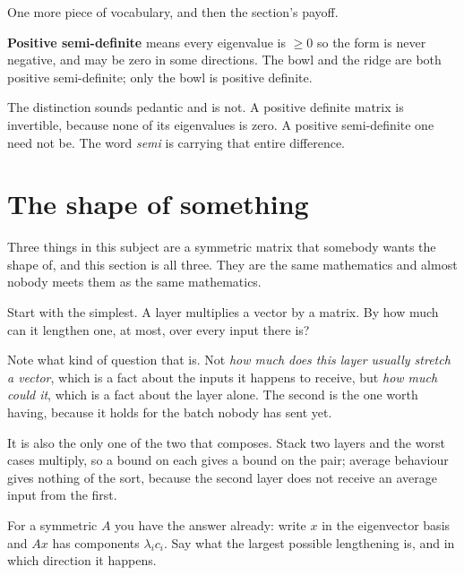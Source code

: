 \begin{fr}
One more piece of vocabulary, and then the section's payoff.

\textbf{Positive semi-definite} means every eigenvalue is $\ge 0$ \dash{} so
the form is never negative, and may be zero in some directions. The bowl and
the ridge are both positive semi-definite; only the bowl is positive definite.

The distinction sounds pedantic and is not. A positive definite matrix is
invertible, because none of its eigenvalues is zero. A positive semi-definite
one need not be. The word \emph{semi} is carrying that entire difference.
\end{fr}

\section{The shape of something}
\label{sec:P10-shape}

\begin{fr}
Three things in this subject are a symmetric matrix that somebody wants the
shape of, and this section is all three. They are the same mathematics and
almost nobody meets them as the same mathematics.

Start with the simplest. A layer multiplies a vector by a matrix. By how much
can it lengthen one, at most, over every input there is?

Note what kind of question that is. Not \emph{how much does this layer usually
stretch a vector}, which is a fact about the inputs it happens to receive, but
\emph{how much could it}, which is a fact about the layer alone. The second is
the one worth having, because it holds for the batch nobody has sent yet.

It is also the only one of the two that composes. Stack two layers and the
worst cases multiply, so a bound on each gives a bound on the pair; average
behaviour gives nothing of the sort, because the second layer does not receive
an average input from the first.

For a symmetric $A$ you have the answer already: write $x$ in the eigenvector
basis and $Ax$ has components $\lambda_ic_i$. Say what the largest possible
lengthening is, and in which direction it happens.
\dotline
\nextframe
\end{fr}

